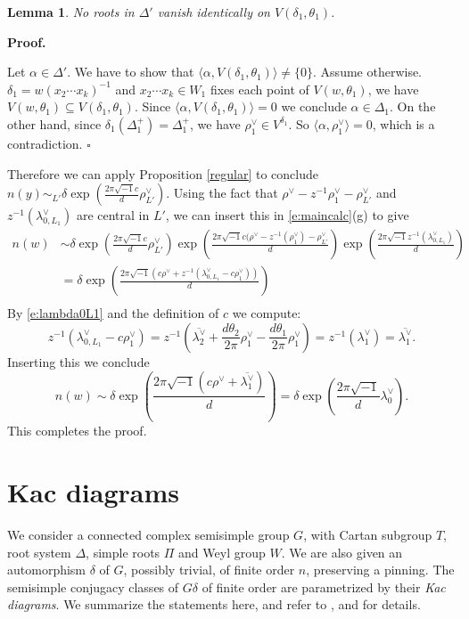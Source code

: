 \documentclass[10pt,leqno]{article}
\newtheorem{lemma}[equation]{Lemma}
\newcommand{\qed}{\hfill $\square$ \medskip}
\newenvironment{proof}[1][Proof]{\noindent\textbf{#1.} }{\qed}
\renewcommand{\a}{\mathfrak a}
\newcommand{\ch}[1]{#1^\vee}
\renewcommand{\sec}[1]{\section{#1}
\renewcommand{\theequation}{\thesection.\arabic{equation}}
  \setcounter{equation}{0}}
\newcommand\inv{^{-1}}
\def\a{\alpha}
\def\d{\delta}
\def\th{\theta}
\def\i{^{-1}}
\renewcommand{\sec}[1]{\section{#1}
\renewcommand{\theequation}{\thesection.\arabic{equation}}
  \setcounter{equation}{0}}
\begin{document}
\begin{lemma}
No roots in $\Delta'$ vanish identically on $V(\d_1, \th_1)$.
\end{lemma}


\begin{proof}

Let $\a \in \Delta'$. We have to show that
$\langle\a, V(\d_1, \th_1)\rangle \neq \{0\}$. 
Assume otherwise.
$\d_1=w (x_2 \cdots x_k) \i$ and $x_2 \cdots x_k \in W_1$ fixes each
point of $V(w, \th_1)$, we have
$V(w, \th_1) \subseteq V(\d_1, \th_1)$. Since $\langle\alpha,V(\delta_1,\theta_1)\rangle=0$ we conclude 
$\a \in \Delta_1$. On the other hand, since
$\d_1(\Delta_1^+) = \Delta_1^+$, we have $\rho_1^\vee \in
V^{\d_1}$. So $\langle\a, \rho_1^\vee \rangle = 0$, which is a contradiction.
\end{proof}


Therefore we can apply Proposition \ref{regular} to conclude
$n(y)\sim_{L'}\delta\exp(\frac{2\pi \sqrt{-1}c}d\ch\rho_{L'})$.
Using the fact that $\ch\rho-z\inv\ch\rho_1-\ch\rho_{L'}$ and $z\inv(\ch\lambda_{0,L_1})$ are central in $L'$, we can insert
this in \eqref{e:maincalc}(g)  to give
$$
\begin{aligned}
n(w)&\sim \delta\exp(\frac{2\pi \sqrt{-1}c}d\ch\rho_{L'})
  \exp(\frac{2\pi \sqrt{-1}c(\ch\rho-z\inv(\ch\rho_1)-\ch\rho_{L'}}d)
  \exp(\frac{2 \pi \sqrt{-1}z\inv( \ch\lambda_{0,L_1})}{d})\\
  &=\delta\exp(\frac{2\pi \sqrt{-1}(c\ch\rho+z\inv(\ch\lambda_{0,L_1}-c\ch\rho_1))}d)\\
\end{aligned}
$$
By \eqref{e:lambda0L1} and the definition of $c$ we compute:
$$
z\inv(\ch\lambda_{0,L_1}-c\ch\rho_1)=z\inv(\overline{\ch\lambda_2}+\frac{d\theta_2}{2\pi}\ch\rho_1-\frac{d\theta_1}{2\pi}\ch\rho_1)
=z\inv(\ch\lambda_1)=\overline{\ch\lambda_1}.
$$
Inserting this we conclude
$$
n(w)\sim\delta\exp(\frac{2\pi \sqrt{-1}(c\ch\rho+\overline{\ch\lambda_1})}d)=
\delta\exp(\frac{2\pi \sqrt{-1}}d\ch\lambda_0).
$$
This completes the proof.


\sec{Kac diagrams}
\label{s:kac}

We consider a connected complex semisimple group $G$, with Cartan subgroup $T$, root system $\Delta$,
simple roots $\Pi$ and Weyl group $W$. We are also given
an  automorphism $\delta$ of $G$, possibly trivial, of finite order $n$, preserving a pinning.
The semisimple
conjugacy classes of $G\delta$ of finite order are parametrized by their
{\it Kac diagrams}. We summarize the statements here, and refer to
\cite{ov}, \cite{kac_book} and \cite{reeder_torsion} for details.
\end{document}
